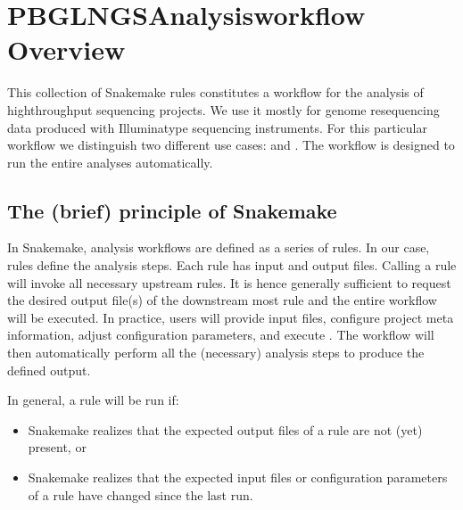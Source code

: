 \documentclass[letterpaper,10pt,english]{sphinxhowto}
\begin{document}
        \newcommand{\sectionbreak}{\clearpage}

\pagestyle{plain}
\sphinxtableofcontents
\pagestyle{normal}
\label{\detokenize{index::doc}}



\section{PBGL\sphinxhyphen{}NGS\sphinxhyphen{}Analysis\sphinxhyphen{}workflow \sphinxhyphen{} Overview}
\label{\detokenize{index:pbgl-ngs-analysis-workflow-overview}}
This collection of Snakemake rules constitutes a workflow for the analysis of high\sphinxhyphen{}throughput sequencing projects. We use it mostly for genome re\sphinxhyphen{}sequencing data produced with Illumina\sphinxhyphen{}type sequencing instruments.
For this particular workflow we distinguish two different use cases:  and . The workflow is designed to run the entire analyses automatically.


\subsection{The (brief) principle of Snakemake}
\label{\detokenize{index:the-brief-principle-of-snakemake}}
In Snakemake, analysis workflows are defined as a series of rules. In our case, rules define the analysis steps. Each rule has input and output files. Calling a rule will invoke all necessary upstream rules. It is hence generally sufficient to request the desired output file(s) of the downstream most rule and the entire workflow will be executed.
In practice, users will provide input files, configure project meta information, adjust configuration parameters, and execute . The workflow will then automatically perform all the (necessary) analysis steps to produce the defined output.

In general, a rule will be run if:
\begin{itemize}
\item {} 
Snakemake realizes that the expected output files of a rule are not (yet) present, or

\item {} 
Snakemake realizes that the expected input files or configuration parameters of a rule have changed since the last run.

\end{itemize}
\end{document}
